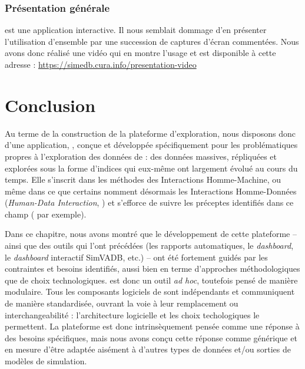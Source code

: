 \subsubsection{Présentation générale}

\simedb{} est une application interactive.
Il nous semblait dommage d'en présenter l'utilisation d'ensemble par une succession de captures d'écran commentées.
Nous avons donc réalisé une vidéo qui en montre l'usage et est disponible à cette adresse : \href{https://simedb.cura.info/presentation-video}{https://simedb.cura.info/presentation-video}


\section*{Conclusion}
Au terme de la construction de la plateforme d'exploration, nous disposons donc d'une application, \simedb{}, conçue et développée spécifiquement pour les problématiques propres à l'exploration des données de \simfeodal{} : des données massives, répliquées et explorées sous la forme d'indices qui eux-même ont largement évolué au cours du temps.
Elle s'inscrit dans les méthodes des Interactions Homme-Machine, ou même dans ce que certains nomment désormais les \og Interactions Homme-Données\fg{} (\og \textit{Human-Data Interaction}\fg{}, \cite{elmqvist_embodied_2011,mortier_human-data_2014}) et s'efforce de suivre les préceptes identifiés dans ce champ (\cite[167-170]{amirpour_amraii_human-data_2018} par exemple).

Dans ce chapitre, nous avons montré que le développement de cette plateforme -- ainsi que des outils qui l'ont précédées (les rapports automatiques, le \textit{dashboard}, le \textit{dashboard} interactif SimVADB, etc.) -- ont été fortement guidés par les contraintes et besoins identifiés, aussi bien en terme d'approches méthodologiques que de choix technologiques.
\simedb{} est donc un outil \textit{ad hoc}, toutefois pensé de manière modulaire.
Tous les composants logiciels de \simedb{} sont indépendants et communiquent de manière standardisée, ouvrant la voie à leur remplacement ou \og interchangeabilité\fg{} : l'architecture logicielle et les choix techologiques le permettent.
La plateforme \simedb{} est donc intrinsèquement pensée comme une réponse à des besoins spécifiques, mais nous avons conçu cette réponse comme générique et en mesure d'être adaptée aisément à d'autres types de données et/ou sorties de modèles de simulation.

